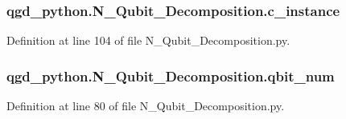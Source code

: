 \subsubsection[{\texorpdfstring{c\+\_\+instance}{c_instance}}]{\setlength{\rightskip}{0pt plus 5cm}qgd\+\_\+python.\+N\+\_\+\+Qubit\+\_\+\+Decomposition.\+c\+\_\+instance}\hypertarget{namespaceqgd__python_1_1_n___qubit___decomposition_a61c44892ca8235f2a7e4bff2055677d6}{}\label{namespaceqgd__python_1_1_n___qubit___decomposition_a61c44892ca8235f2a7e4bff2055677d6}


Definition at line 104 of file N\+\_\+\+Qubit\+\_\+\+Decomposition.\+py.

\subsubsection[{\texorpdfstring{qbit\+\_\+num}{qbit_num}}]{\setlength{\rightskip}{0pt plus 5cm}qgd\+\_\+python.\+N\+\_\+\+Qubit\+\_\+\+Decomposition.\+qbit\+\_\+num}\hypertarget{namespaceqgd__python_1_1_n___qubit___decomposition_ae24ab085d61812b01a6f7e1678941c65}{}\label{namespaceqgd__python_1_1_n___qubit___decomposition_ae24ab085d61812b01a6f7e1678941c65}


Definition at line 80 of file N\+\_\+\+Qubit\+\_\+\+Decomposition.\+py.

